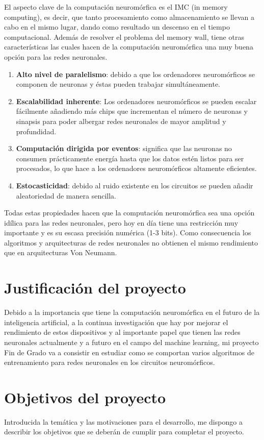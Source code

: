 El aspecto clave de la computación neuromórfica es el IMC (in memory computing), es decir, que tanto procesamiento como almacenamiento se llevan a cabo en el mismo lugar, dando como resultado un descenso en el tiempo computacional. Además de resolver el problema del memory wall, tiene otras características las cuales hacen de la computación neuromórfica una muy buena opción para las redes neuronales. 
\begin{enumerate}
    \item \textbf{Alto nivel de paralelismo}: debido a que los ordenadores neuromórficos se componen de neuronas y éstas pueden trabajar simultáneamente.
    \item \textbf{Escalabilidad inherente}: Los ordenadores neuromórficos se pueden escalar fácilmente añadiendo más chips que incrementan el número de neuronas y sinapsis para poder albergar redes neuronales de mayor amplitud y profundidad.
    \item \textbf{Computación dirigida por eventos}: significa que las neuronas no consumen prácticamente energía hasta que los datos estén listos para ser procesados, lo que hace a los ordenadores neuromórficos altamente eficientes.
    \item \textbf{Estocasticidad}: debido al ruido existente en los circuitos se pueden añadir aleatoriedad de manera sencilla.
\end{enumerate}

Todas estas propiedades hacen que la computación neuromórfica sea una opción idílica para las redes neuronales, pero hoy en día tiene una restricción muy importante y es su escasa precisión numérica (1-3 bits). Como consecuencia los algoritmos y arquitecturas de redes neuronales no obtienen el mismo rendimiento que en arquitecturas Von Neumann.

\section{Justificación del proyecto}
Debido a la importancia que tiene la computación neuromórfica en el futuro de la inteligencia artificial, a la continua investigación que hay por mejorar el rendimiento de estos dispositivos y al importante papel que tienen las redes neuronales actualmente y a futuro en el campo del machine learning, mi proyecto Fin de Grado va a consistir en estudiar como se comportan varios algoritmos de entrenamiento para redes neuronales en los circuitos neuromórficos. 

\section{Objetivos del proyecto}
Introducida la temática y las motivaciones para el desarrollo, me dispongo a describir los objetivos que se deberán de cumplir para completar el proyecto.

